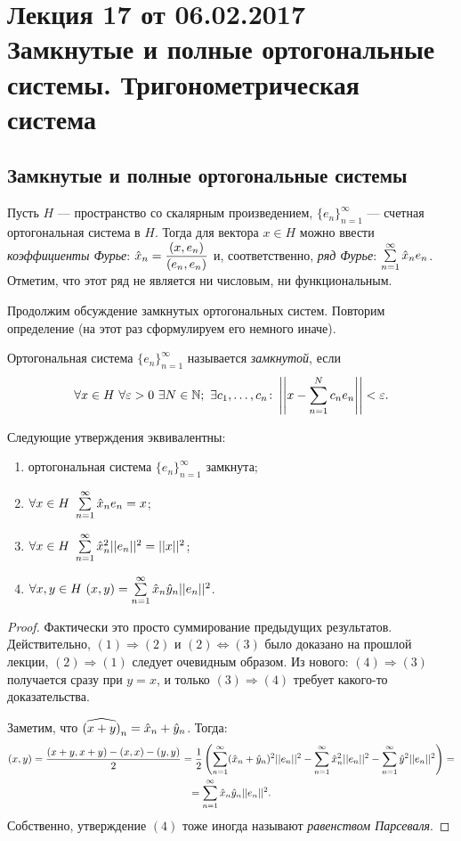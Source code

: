 \section{Лекция 17 от 06.02.2017 \\ Замкнутые и полные ортогональные системы. Тригонометрическая система}
\subsection{Замкнутые и полные ортогональные системы}
Пусть $H$ --- пространство со скалярным произведением, $\{e_n\}_{n=1}^{\infty}$  --- счетная ортогональная система в $H$. Тогда для вектора $x \in H$ можно ввести \textit{коэффициенты Фурье}: $\hat{x}_n = \dfrac{(x, e_n)}{(e_n, e_n)}$ и, соответственно, \textit{ряд Фурье}: $\sum\limits_{n=1}^{\infty} \hat{x}_ne_n $. Отметим, что этот ряд не является ни числовым, ни функциональным.

Продолжим обсуждение замкнутых ортогональных систем. Повторим определение (на этот раз сформулируем его немного иначе).
\begin{Def}
Ортогональная система $\{e_n\}_{n=1}^{\infty}$ называется \textit{замкнутой}, если
$$
\forall x \in H \ \forall \varepsilon > 0 \ \exists N \in \mathbb{N}; \ \exists c_1, \ldots, c_n \colon \left|\left|x - \sum\limits_{n=1}^{N}c_ne_n\right|\right| < \varepsilon.
$$
\end{Def}

\begin{Theorem}\label{pars}
    \label{16equiv}
Следующие утверждения эквивалентны:
\begin{enumerate}
\item ортогональная система $\{e_n\}_{n=1}^{\infty}$ замкнута;
\item $\forall x \in H \  \sum\limits_{n=1}^{\infty}\hat{x}_ne_n = x$;
\item $\forall x \in H \ \sum\limits_{n=1}^{\infty} \hat{x}^2_n||e_n||^2 = ||x||^2 $;
\item $\forall x, y \in H \ (x, y) = \sum\limits_{n=1}^{\infty} \hat{x}_n\hat{y}_n||e_n||^2$.
\end{enumerate}
\end{Theorem}
\begin{proof}
Фактически это просто суммирование предыдущих результатов. Действительно, $(1) \Rightarrow (2)$ и $(2) \Leftrightarrow (3)$ было доказано на прошлой лекции, $(2) \Rightarrow (1)$ следует очевидным образом.  Из нового: $(4) \Rightarrow (3)$ получается сразу при $y = x$, и только $(3) \Rightarrow (4)$ требует какого-то доказательства.

Заметим, что $\widehat{(x + y)}_n = \hat{x}_n + \hat{y}_n$. Тогда:
\begin{gather*}
(x, y) = \frac{(x + y, x+y) - (x, x) - (y, y)}{2} = \frac{1}{2} \left( \sum\limits_{n=1}^{\infty} (\hat{x}_n + \hat{y}_n)^2 ||e_n||^2 - \sum\limits_{n=1}^{\infty} \hat{x}_n^2||e_n||^2 - \sum\limits_{n=1}^{\infty} \hat{y}^2||e_n||^2 \right) = \\ = \sum\limits_{n=1}^{\infty} \hat{x}_n\hat{y}_n||e_n||^2.
\end{gather*}
Собственно, утверждение $(4)$ тоже иногда называют \textit{равенством Парсеваля}.
\end{proof}


